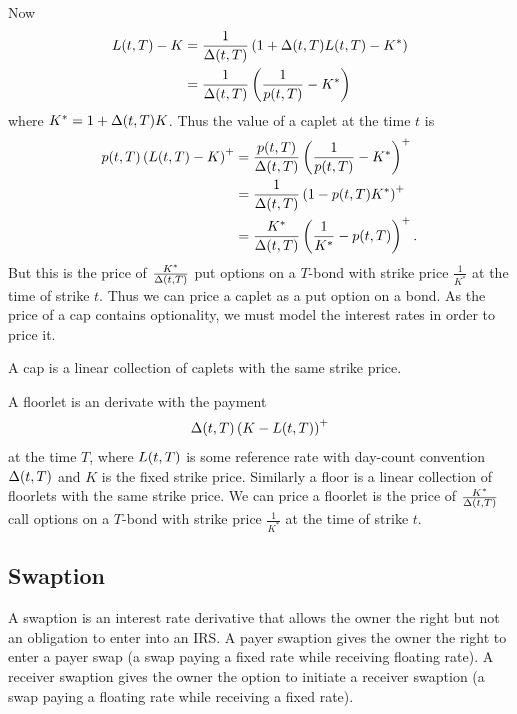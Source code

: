 Now
	\begin{align}
		L(t,T) - K &= \frac{1}{\Delta(t,T)} \left( 1+\Delta(t,T)L(t,T) - K^* \right) \\
			&= \frac{1}{\Delta(t,T)} \left( \frac{1}{p(t,T)} - K^* \right)
	\end{align}
where $K^* = 1+ \Delta(t,T)K$. Thus the value of a caplet at the time $t$ is
	\begin{align}
		p(t,T) \left( L(t,T) - K \right)^+ &= \frac{p(t,T)}{\Delta(t,T)} \left( \frac{1}{p(t,T)} - K^* \right)^+ \\
			&= \frac{1}{\Delta(t,T)} \left( 1 - p(t,T) K^* \right)^+ \\
			&= \frac{K^*}{\Delta(t,T)} \left( \frac{1}{K^*} - p(t,T) \right)^+ .
	\end{align}
But this is the price of $\frac{K^*}{\Delta(t,T)}$ put options on a $T$-bond with strike price $\frac{1}{K^*}$ at the time of strike $t$. Thus we can price a caplet as a put option on a bond. As the price of a cap contains optionality, we must model the interest rates in order to price it.

A cap is a linear collection of caplets with the same strike price.

A floorlet is an derivate with the payment
	\begin{align}
\Delta(t,T) \left( K - L(t,T) \right)^+
\end{align}
at the time $T$, where $L(t,T)$ is some reference rate with day-count convention $\Delta(t,T)$ and $K$ is the fixed strike price. Similarly a floor is a linear collection of floorlets with the same strike price. We can price a floorlet is the price of $\frac{K^*}{\Delta(t,T)}$ call options on a $T$-bond with strike price $\frac{1}{K^*}$ at the time of strike $t$.

\subsection{Swaption}

A swaption is an interest rate derivative that allows the owner the right but not an obligation to enter into an IRS. A payer swaption gives the owner the right to enter a payer swap (a swap paying a fixed rate while receiving floating rate). A receiver swaption gives the owner the option to initiate a receiver swaption (a swap paying a floating rate while receiving a fixed rate).

